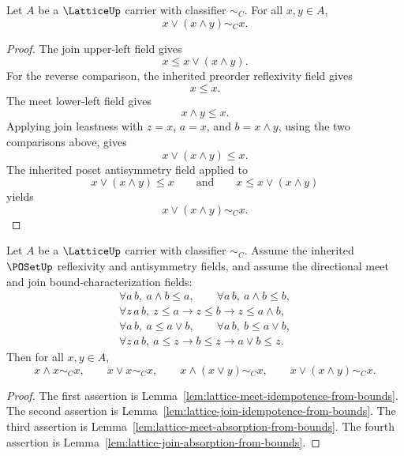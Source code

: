 \begin{lemma}
\label{lem:lattice-join-absorption-from-bounds}
Let \(A\) be a \(\LatticeUp\) carrier with classifier \(\sim_C\).
For all \(x,y\in A\),
$$
  x\vee(x\wedge y)\sim_C x .
$$
\end{lemma}
\begin{proof}
The join upper-left field gives
$$
  x\le x\vee(x\wedge y).
$$
For the reverse comparison, the inherited preorder reflexivity field gives
$$
  x\le x .
$$
The meet lower-left field gives
$$
  x\wedge y\le x .
$$
Applying join leastness with \(z=x\), \(a=x\), and \(b=x\wedge y\), using the two comparisons above, gives
$$
  x\vee(x\wedge y)\le x .
$$
The inherited poset antisymmetry field applied to
$$
  x\vee(x\wedge y)\le x  \qquad\text{and}\qquad  x\le x\vee(x\wedge y)
$$
yields
$$
  x\vee(x\wedge y)\sim_C x .
$$
\end{proof}

\begin{theorem}
\label{thm:lattice-idempotence-absorption-from-bound-characterization}
Let \(A\) be a \(\LatticeUp\) carrier with classifier \(\sim_C\). Assume the inherited \(\POSetUp\) reflexivity and antisymmetry fields, and assume the directional meet and join bound-characterization fields:
$$
\begin{gathered}
  \forall a\,b,\ a\wedge b\le a,\qquad
  \forall a\,b,\ a\wedge b\le b,\\
  \forall z\,a\,b,\ z\le a\to z\le b\to z\le a\wedge b,\\
  \forall a\,b,\ a\le a\vee b,\qquad
  \forall a\,b,\ b\le a\vee b,\\
  \forall z\,a\,b,\ a\le z\to b\le z\to a\vee b\le z.
\end{gathered}
$$
Then for all \(x,y\in A\),
$$
  x\wedge x\sim_C x,\qquad
  x\vee x\sim_C x,\qquad
  x\wedge(x\vee y)\sim_C x,\qquad
  x\vee(x\wedge y)\sim_C x .
$$
\end{theorem}
\begin{proof}
The first assertion is Lemma~\ref{lem:lattice-meet-idempotence-from-bounds}. The second assertion is Lemma~\ref{lem:lattice-join-idempotence-from-bounds}. The third assertion is Lemma~\ref{lem:lattice-meet-absorption-from-bounds}. The fourth assertion is Lemma~\ref{lem:lattice-join-absorption-from-bounds}.
\end{proof}

